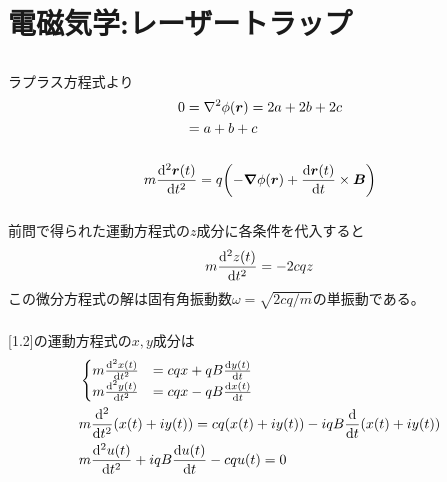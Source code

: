 \documentclass[../ap_2023.tex]{subfiles}
\begin{document}
\setcounter{chapter}{3}
\chapter{電磁気学:レーザートラップ}
\section{}
\subsection{}
ラプラス方程式より
\begin{equation}\begin{aligned}[b]
    0 &= \laplacian \phi(\vb*{r})= 2a+2b+2c \\
    &= a+b+c
\end{aligned}\end{equation}

\subsection{}
\begin{equation}\begin{aligned}[b]
    m\dv[2]{\vb*{r}(t)}{t} = q\qty(-\grad\phi(\vb*{r})+\dv{\vb*{r}(t)}{t}\times \vb*{B})
\end{aligned}\end{equation}

\subsection{}
前問で得られた運動方程式の\(z\)成分に各条件を代入すると
\begin{equation}\begin{aligned}[b]
    m\dv[2]{z(t)}{t}=-2cq z
\end{aligned}\end{equation}
この微分方程式の解は固有角振動数\(\omega=\sqrt{2cq/m}\)の単振動である。

\subsection{}
[1.2]の運動方程式の\(x,y\)成分は
\begin{equation}\begin{aligned}[b]
    &\begin{cases}
        m\dv[2]{x(t)}{t} &= cqx +qB\dv{y(t)}{t}\\
        m\dv[2]{y(t)}{t} &= cqx -qB\dv{x(t)}{t}
    \end{cases}\\
    &m\dv[2]{t}(x(t)+iy(t)) = cq(x(t)+iy(t)) -iqB\dv{t}(x(t)+iy(t))\\
    &m\dv[2]{u(t)}{t} +iqB\dv{u(t)}{t} -cq u(t)=0
\end{aligned}\end{equation}
\end{document}
